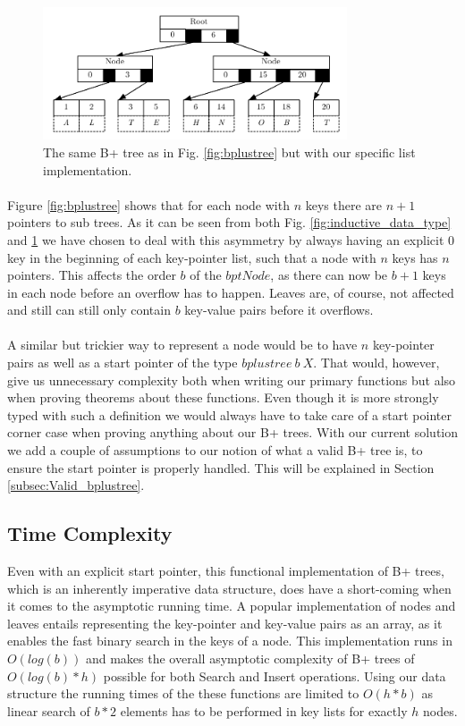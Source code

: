 \begin{figure}
 \centering
   \includegraphics[width=90mm]{diagrams/BPlusTreeImpl.pdf}
 \caption{The same B+ tree as in Fig. \ref{fig:bplustree} but with our specific list implementation.}
 \label{fig:bplustreeImpl}
\end{figure}

\paragraph{}
Figure \ref{fig:bplustree} shows that for each node with $n$ keys there are $n+1$ pointers to sub trees. As it can be seen from both Fig. \ref{fig:inductive_data_type} and \ref{fig:bplustreeImpl} we have chosen to deal with this asymmetry by always having an explicit $0$ key in the beginning of each key-pointer list, such that a node with $n$ keys has $n$ pointers. This affects the order $b$ of the $bptNode$, as there can now be $b+1$ keys in each node before an overflow has to happen. Leaves are, of course, not affected and still can still only contain $b$ key-value pairs before it overflows.
\paragraph{}
A similar but trickier way to represent a node would be to have $n$ key-pointer pairs as well as a start pointer of the type $bplustree~b~X$. That would, however, give us unnecessary complexity both when writing our primary functions but also when proving theorems about these functions. Even though it is more strongly typed with such a definition we would always have to take care of a start pointer corner case when proving anything about our B+ trees. With our current solution we add a couple of assumptions to our notion of what a valid B+ tree is, to ensure the start pointer is properly handled. This will be explained in Section \ref{subsec:Valid_bplustree}.

\subsection{Time Complexity}
Even with an explicit start pointer, this functional implementation of B+ trees, which is an inherently imperative data structure, does have a short-coming when it comes to the asymptotic running time. A popular implementation of nodes and leaves entails representing the key-pointer and key-value pairs as an array, as it enables the fast binary search in the keys of a node. This implementation runs in $O(log(b))$ and makes the overall asymptotic complexity of B+ trees of $O(log(b)*h)$ possible for both Search and Insert operations. Using our data structure the running times of the these functions are limited to $O(h*b)$ as linear search of $b*2$ elements has to be performed in key lists for exactly $h$ nodes. 
